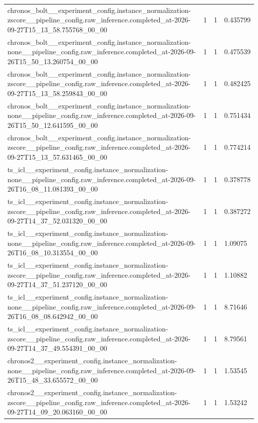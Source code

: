 \begin{tabular}{llll}
chronos\_bolt\_\_experiment\_config.instance\_normalization-zscore\_\_pipeline\_config.raw\_inference.completed\_at-2026-09-27T15\_13\_58.755768\_00\_00 & 1 & 1 & 0.435799 \\
chronos\_bolt\_\_experiment\_config.instance\_normalization-none\_\_pipeline\_config.raw\_inference.completed\_at-2026-09-26T15\_50\_13.260754\_00\_00 & 1 & 1 & 0.475539 \\
chronos\_bolt\_\_experiment\_config.instance\_normalization-zscore\_\_pipeline\_config.raw\_inference.completed\_at-2026-09-27T15\_13\_58.259843\_00\_00 & 1 & 1 & 0.482425 \\
chronos\_bolt\_\_experiment\_config.instance\_normalization-none\_\_pipeline\_config.raw\_inference.completed\_at-2026-09-26T15\_50\_12.641595\_00\_00 & 1 & 1 & 0.751434 \\
chronos\_bolt\_\_experiment\_config.instance\_normalization-zscore\_\_pipeline\_config.raw\_inference.completed\_at-2026-09-27T15\_13\_57.631465\_00\_00 & 1 & 1 & 0.774214 \\
ts\_icl\_\_experiment\_config.instance\_normalization-none\_\_pipeline\_config.raw\_inference.completed\_at-2026-09-26T16\_08\_11.081393\_00\_00 & 1 & 1 & 0.378778 \\
ts\_icl\_\_experiment\_config.instance\_normalization-zscore\_\_pipeline\_config.raw\_inference.completed\_at-2026-09-27T14\_37\_52.031320\_00\_00 & 1 & 1 & 0.387272 \\
ts\_icl\_\_experiment\_config.instance\_normalization-none\_\_pipeline\_config.raw\_inference.completed\_at-2026-09-26T16\_08\_10.313554\_00\_00 & 1 & 1 & 1.09075 \\
ts\_icl\_\_experiment\_config.instance\_normalization-zscore\_\_pipeline\_config.raw\_inference.completed\_at-2026-09-27T14\_37\_51.237120\_00\_00 & 1 & 1 & 1.10882 \\
ts\_icl\_\_experiment\_config.instance\_normalization-none\_\_pipeline\_config.raw\_inference.completed\_at-2026-09-26T16\_08\_08.642942\_00\_00 & 1 & 1 & 8.71646 \\
ts\_icl\_\_experiment\_config.instance\_normalization-zscore\_\_pipeline\_config.raw\_inference.completed\_at-2026-09-27T14\_37\_49.554391\_00\_00 & 1 & 1 & 8.79561 \\
chronos2\_\_experiment\_config.instance\_normalization-none\_\_pipeline\_config.raw\_inference.completed\_at-2026-09-26T15\_48\_33.655572\_00\_00 & 1 & 1 & 1.53545 \\
chronos2\_\_experiment\_config.instance\_normalization-zscore\_\_pipeline\_config.raw\_inference.completed\_at-2026-09-27T14\_09\_20.063160\_00\_00 & 1 & 1 & 1.53242 \\

\end{tabular}
